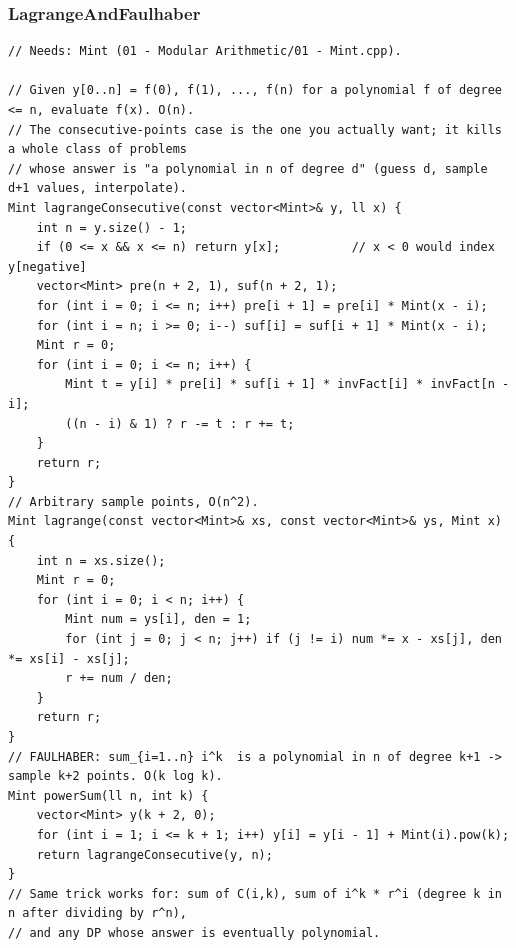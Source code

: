 \documentclass[9pt,a4paper,twocolumn]{extarticle}
\begin{document}
\subsubsection{LagrangeAndFaulhaber}
\nopagebreak
\begin{lstlisting}
// Needs: Mint (01 - Modular Arithmetic/01 - Mint.cpp).

// Given y[0..n] = f(0), f(1), ..., f(n) for a polynomial f of degree <= n, evaluate f(x). O(n).
// The consecutive-points case is the one you actually want; it kills a whole class of problems
// whose answer is "a polynomial in n of degree d" (guess d, sample d+1 values, interpolate).
Mint lagrangeConsecutive(const vector<Mint>& y, ll x) {
    int n = y.size() - 1;
    if (0 <= x && x <= n) return y[x];          // x < 0 would index y[negative]
    vector<Mint> pre(n + 2, 1), suf(n + 2, 1);
    for (int i = 0; i <= n; i++) pre[i + 1] = pre[i] * Mint(x - i);
    for (int i = n; i >= 0; i--) suf[i] = suf[i + 1] * Mint(x - i);
    Mint r = 0;
    for (int i = 0; i <= n; i++) {
        Mint t = y[i] * pre[i] * suf[i + 1] * invFact[i] * invFact[n - i];
        ((n - i) & 1) ? r -= t : r += t;
    }
    return r;
}
// Arbitrary sample points, O(n^2).
Mint lagrange(const vector<Mint>& xs, const vector<Mint>& ys, Mint x) {
    int n = xs.size();
    Mint r = 0;
    for (int i = 0; i < n; i++) {
        Mint num = ys[i], den = 1;
        for (int j = 0; j < n; j++) if (j != i) num *= x - xs[j], den *= xs[i] - xs[j];
        r += num / den;
    }
    return r;
}
// FAULHABER: sum_{i=1..n} i^k  is a polynomial in n of degree k+1 -> sample k+2 points. O(k log k).
Mint powerSum(ll n, int k) {
    vector<Mint> y(k + 2, 0);
    for (int i = 1; i <= k + 1; i++) y[i] = y[i - 1] + Mint(i).pow(k);
    return lagrangeConsecutive(y, n);
}
// Same trick works for: sum of C(i,k), sum of i^k * r^i (degree k in n after dividing by r^n),
// and any DP whose answer is eventually polynomial.
\end{lstlisting}

\filbreak
\end{document}
